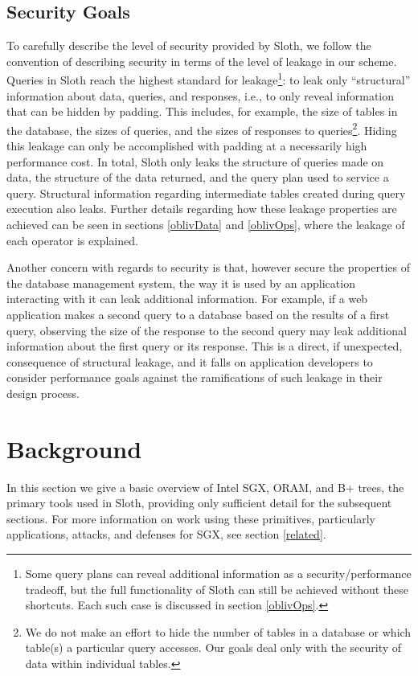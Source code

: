 \documentclass[USenglish,oneside,twocolumn]{article}
\def\name/{Sloth}
\begin{document}
\subsection{Security Goals}
To carefully describe the level of security provided by \name/, we follow the convention \cite{FVY+17} of describing security in terms of the level of leakage in our scheme. Queries in \name/ reach the highest standard for leakage\footnote{Some query plans can reveal additional information as a security/performance tradeoff, but the full functionality of \name/ can still be achieved without these shortcuts. Each such case is discussed in section \ref{oblivOps}.}: to leak only ``structural'' information about data, queries, and responses, i.e., to only reveal information that can be hidden by padding. This includes, for example, the size of tables in the database, the sizes of queries, and the sizes of responses to queries\footnote{We do not make an effort to hide the number of tables in a database or which table(s) a particular query accesses. Our goals deal only with the security of data within individual tables.}. Hiding this leakage can only be accomplished with padding at a necessarily high performance cost. In total, \name/ only leaks the structure of queries made on data, the structure of the data returned, and the query plan used to service a query. Structural information regarding intermediate tables created during query execution also leaks. Further details regarding how these leakage properties are achieved can be seen in sections \ref{oblivData} and \ref{oblivOps}, where the leakage of each operator is explained. 

Another concern with regards to security is that, however secure the properties of the database management system, the way it is used by an application interacting with it can leak additional information. For example, if a web application makes a second query to a database based on the results of a first query, observing the size of the response to the second query may leak additional information about the first query or its response. This is a direct, if unexpected, consequence of structural leakage, and it falls on application developers to consider performance goals against the ramifications of such leakage in their design process. 

\section{Background}\label{background}
In this section we give a basic overview of Intel SGX, ORAM, and B+ trees, the primary tools used in \name/, providing only sufficient detail for the subsequent sections. For more information on work using these primitives, particularly applications, attacks, and defenses for SGX, see section \ref{related}.
\end{document}
